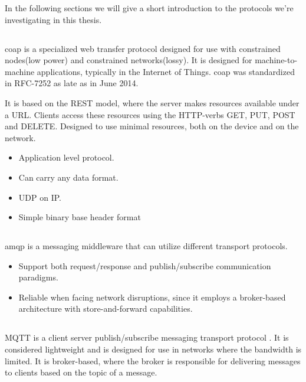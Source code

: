 In the following sections we will give a short introduction to the protocols
we're investigating in this thesis.



\subsection{}

\gls{coap} is a specialized web transfer protocol designed for use with
constrained nodes(low power) and constrained networks(lossy)\cite{rfc-7252}. It
is designed for machine-to-machine applications, typically in the Internet of
Things. \gls{coap} was standardized in RFC-7252 as late as in June 2014.

It is based on the REST model, where the server makes resources available  under
a URL. Clients access these resources using the HTTP-verbs GET, PUT, POST and
DELETE. Designed to use minimal resources, both on the device and on the
network.

\begin{itemize}
    \item Application level protocol.
    \item Can carry any data format.
    \item UDP on IP.
    \item Simple binary base header format
\end{itemize}


\subsection{}

\gls{amqp} is a messaging middleware that can utilize different transport
protocols.

\begin{itemize}
    \item Support both request/response and publish/subscribe communication
    paradigms.
    \item Reliable when facing network disruptions, since it employs a
    broker-based architecture with store-and-forward capabilities.
\end{itemize}

\subsection{}

MQTT is a client server publish/subscribe messaging transport protocol
\cite{oasis-mqtt}. It is considered lightweight and is designed for use in networks
where the bandwidth is limited. It is broker-based, where the broker is
responsible for delivering messages to clients based on the topic of a
message.

